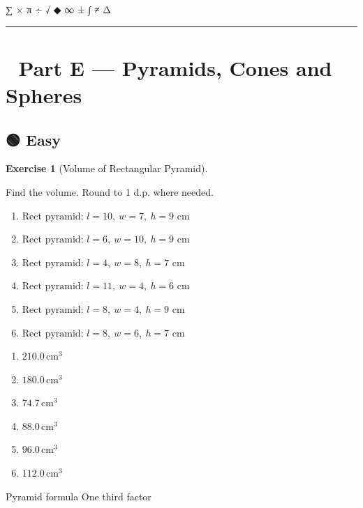 \documentclass[
  letterpaper,
  DIV=11,
  numbers=noendperiod]{scrreprt}
\theoremstyle{definition}
\newtheorem{exercise}{Exercise}[chapter]
\theoremstyle{remark}
\begin{document}
∑ × π ÷ √ ◆ ∞ ± ∫ ≠ Δ

\begin{center}\rule{0.5\linewidth}{0.5pt}\end{center}

\section{🔺 Part E --- Pyramids, Cones and Spheres}\label{sec-curved}

\subsection{🟢 Easy}

\begin{exercise}[Volume of Rectangular
Pyramid]\protect\hypertarget{exr-cur-1}{}\label{exr-cur-1}

Find the volume. Round to 1 d.p. where needed.

\begin{enumerate}
\def\labelenumi{\alph{enumi})}
\item
  \(\text{Rect pyramid: }l=10,\ w=7,\ h=9\text{ cm}\)
\item
  \(\text{Rect pyramid: }l=6,\ w=10,\ h=9\text{ cm}\)
\item
  \(\text{Rect pyramid: }l=4,\ w=8,\ h=7\text{ cm}\)
\item
  \(\text{Rect pyramid: }l=11,\ w=4,\ h=6\text{ cm}\)
\item
  \(\text{Rect pyramid: }l=8,\ w=4,\ h=9\text{ cm}\)
\item
  \(\text{Rect pyramid: }l=8,\ w=6,\ h=7\text{ cm}\)
\end{enumerate}

\begin{tcolorbox}[enhanced jigsaw, opacitybacktitle=0.6, coltitle=black, arc=.35mm, colframe=quarto-callout-tip-color-frame, colback=white, bottomrule=.15mm, left=2mm, colbacktitle=quarto-callout-tip-color!10!white, titlerule=0mm, opacityback=0, title=\textcolor{quarto-callout-tip-color}{\faLightbulb}\hspace{0.5em}{🔍 View Solution}, leftrule=.75mm, breakable, rightrule=.15mm, bottomtitle=1mm, toptitle=1mm, toprule=.15mm]

\begin{enumerate}
\def\labelenumi{\alph{enumi})}
\item
  \(210.0\,\text{cm}^{3}\)
\item
  \(180.0\,\text{cm}^{3}\)
\item
  \(74.7\,\text{cm}^{3}\)
\item
  \(88.0\,\text{cm}^{3}\)
\item
  \(96.0\,\text{cm}^{3}\)
\item
  \(112.0\,\text{cm}^{3}\)
\end{enumerate}

\end{tcolorbox}

{Pyramid formula} {One third factor}

\end{exercise}
\end{document}
